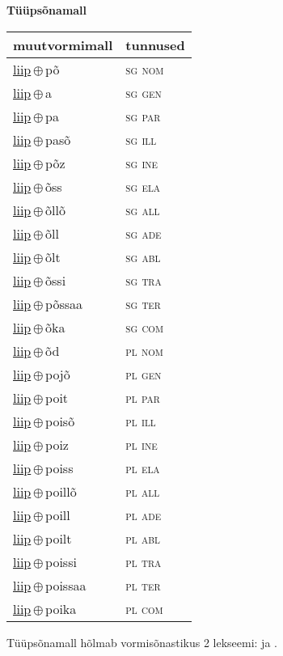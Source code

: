 

\vspace{3.5em}
\noindent \begin{minipage}{\textwidth}
\noindent \textbf{Tüüpsõnamall \,}\\

\begin{sideways}
\begin{tabular}{l l}
muutvormimall & tunnused \\
\hline
\underline{liip}\,$\oplus$\,põ & \textsc{ sg nom } \\
\underline{liip}\,$\oplus$\,a & \textsc{ sg gen } \\
\underline{liip}\,$\oplus$\,pa & \textsc{ sg par } \\
\underline{liip}\,$\oplus$\,pasõ & \textsc{ sg ill } \\
\underline{liip}\,$\oplus$\,põz & \textsc{ sg ine } \\
\underline{liip}\,$\oplus$\,õss & \textsc{ sg ela } \\
\underline{liip}\,$\oplus$\,õllõ & \textsc{ sg all } \\
\underline{liip}\,$\oplus$\,õll & \textsc{ sg ade } \\
\underline{liip}\,$\oplus$\,õlt & \textsc{ sg abl } \\
\underline{liip}\,$\oplus$\,õssi & \textsc{ sg tra } \\
\underline{liip}\,$\oplus$\,põssaa & \textsc{ sg ter } \\
\underline{liip}\,$\oplus$\,õka & \textsc{ sg com } \\
\underline{liip}\,$\oplus$\,õd & \textsc{ pl nom } \\
\underline{liip}\,$\oplus$\,pojõ & \textsc{ pl gen } \\
\underline{liip}\,$\oplus$\,poit & \textsc{ pl par } \\
\underline{liip}\,$\oplus$\,poisõ & \textsc{ pl ill } \\
\underline{liip}\,$\oplus$\,poiz & \textsc{ pl ine } \\
\underline{liip}\,$\oplus$\,poiss & \textsc{ pl ela } \\
\underline{liip}\,$\oplus$\,poillõ & \textsc{ pl all } \\
\underline{liip}\,$\oplus$\,poill & \textsc{ pl ade } \\
\underline{liip}\,$\oplus$\,poilt & \textsc{ pl abl } \\
\underline{liip}\,$\oplus$\,poissi & \textsc{ pl tra } \\
\underline{liip}\,$\oplus$\,poissaa & \textsc{ pl ter } \\
\underline{liip}\,$\oplus$\,poika & \textsc{ pl com } \\
\end{tabular}
\end{sideways}
\label{tab:tüüpsõnamall-liippõ}

\end{minipage}

 
\vspace{1em}
\noindent Tüüpsõnamall  hõlmab vormisõnastikus 2 lekseemi:  ja .
